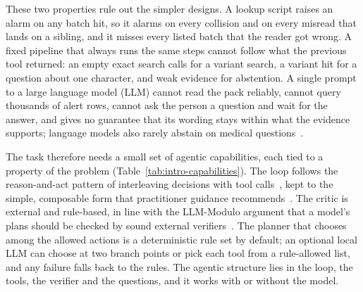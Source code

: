 These two properties rule out the simpler designs. A lookup script raises an alarm on any batch
hit, so it alarms on every collision and on every misread that lands on a sibling, and it misses
every listed batch that the reader got wrong. A fixed pipeline that always runs the same steps
cannot follow what the previous tool returned: an empty exact search calls for a variant search, a
variant hit for a question about one character, and weak evidence for abstention. A single prompt to a large
language model (LLM) cannot read the pack reliably, cannot query thousands of alert rows, cannot
ask the person a question and wait for the answer, and gives no guarantee that its wording stays
within what the evidence supports; language models also rarely abstain on medical
questions~\cite{cocchieri2026abstain}.

The task therefore needs a small set of agentic capabilities, each tied to a property of the
problem (Table~\ref{tab:intro-capabilities}). The loop follows the reason-and-act pattern of
interleaving decisions with tool calls~\cite{yao2023react}, kept to the simple, composable form
that practitioner guidance recommends~\cite{schluntz2024building}. The critic is external and
rule-based, in line with the LLM-Modulo argument that a model's plans should be checked by sound
external verifiers~\cite{kambhampati2024llmmodulo}. The planner that chooses among the allowed actions is a
deterministic rule set by default; an optional local LLM can choose at two branch points or pick each tool
from a rule-allowed list, and any failure falls back to the rules. The agentic structure lies in the loop, the tools, the verifier and the
questions, and it works with or without the model.

